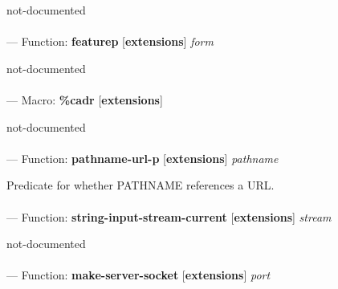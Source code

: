 \begin{adjustwidth}{5em}{5em}
not-documented
\end{adjustwidth}

\paragraph{}
\label{EXTENSIONS:FEATUREP}
--- Function: \textbf{featurep} [\textbf{extensions}] \textit{form}

\begin{adjustwidth}{5em}{5em}
not-documented
\end{adjustwidth}

\paragraph{}
\label{EXTENSIONS:CADR}
--- Macro: \textbf{\%cadr} [\textbf{extensions}] \textit{}

\begin{adjustwidth}{5em}{5em}
not-documented
\end{adjustwidth}

\paragraph{}
\label{EXTENSIONS:PATHNAME-URL-P}
--- Function: \textbf{pathname-url-p} [\textbf{extensions}] \textit{pathname}

\begin{adjustwidth}{5em}{5em}
Predicate for whether PATHNAME references a URL.
\end{adjustwidth}

\paragraph{}
\label{EXTENSIONS:STRING-INPUT-STREAM-CURRENT}
--- Function: \textbf{string-input-stream-current} [\textbf{extensions}] \textit{stream}

\begin{adjustwidth}{5em}{5em}
not-documented
\end{adjustwidth}

\paragraph{}
\label{EXTENSIONS:MAKE-SERVER-SOCKET}
--- Function: \textbf{make-server-socket} [\textbf{extensions}] \textit{port}

